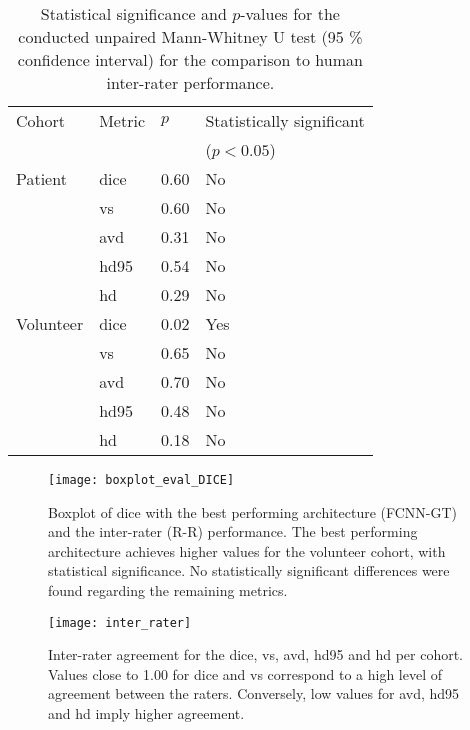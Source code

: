 \begin{table}[htbp]
   \centering
   \caption[Statistics for Comparison to Inter-Rater Performance]{Statistical significance and $p$-values for the conducted unpaired Mann-Whitney U test (95 \% confidence interval) for the comparison to human inter-rater performance.}
   \begin{tabular}{l*{3}{l}}
      \toprule
        Cohort	    & Metric        & $p$       & Statistically significant\\
      			    &               &           &($p < 0.05$)          \\
      \midrule
        Patient     & \gls{dice}    & 0.60      & No\\
                    & \gls{vs}      & 0.60      & No\\
                    & \gls{avd}     & 0.31      & No\\
                    & \gls{hd95}    & 0.54      & No\\
                    & \gls{hd}      & 0.29      & No\\
        \midrule
        Volunteer   & \gls{dice}    & 0.02      & Yes\\
                    & \gls{vs}      & 0.65      & No\\
                    & \gls{avd}     & 0.70      & No\\
                    & \gls{hd95}    & 0.48      & No\\
                    & \gls{hd}      & 0.18      & No\\
      \bottomrule
   \end{tabular}
   \label{tab:res_fcnn_rater_statistics}
\end{table}

\begin{figure}[htbp]
	\centering
	\texttt{[image: boxplot\_eval\_DICE]}
    \caption[Boxplot of the \acrlong{dice} compared to the inter-rater performance]{Boxplot of \acrlong{dice} with the best performing architecture (FCNN-GT) and the inter-rater (R-R) performance. The best performing architecture achieves higher values for the volunteer cohort, with statistical significance. No statistically significant differences were found regarding the remaining metrics.}
    \label{fig:results_eval_boxplot_dice}
\end{figure}

\begin{figure}[htbp]	
	\texttt{[image: inter\_rater]}
    \caption[Heatmap for Inter-Rater Agreement]{Inter-rater agreement for the \acrlong{dice}, \acrlong{vs}, \acrlong{avd}, \acrlong{hd95} and \acrlong{hd} per cohort. Values close to 1.00 for \gls{dice} and \gls{vs} correspond to a high level of agreement between the raters. Conversely, low values for \gls{avd}, \gls{hd95} and \gls{hd} imply higher agreement.}
    \label{fig:res_inter_rater}
\end{figure}

